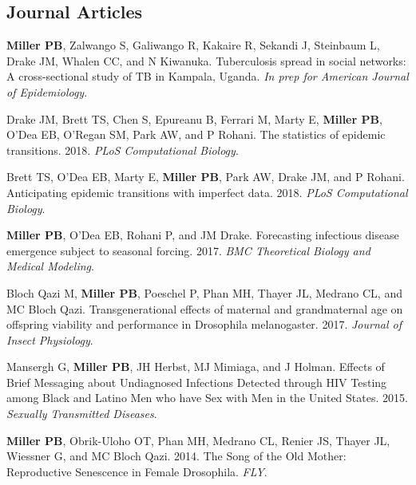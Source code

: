 \documentclass[letterpaper]{article}
\renewenvironment{itemize}{
  \begin{list}{}{
    \setlength{\leftmargin}{1.5em}
  }
}{
  \end{list}
}
\begin{document}
\subsection*{Journal Articles}

\begin{itemize}
\item   \textbf{Miller PB}, Zalwango S, Galiwango R, Kakaire R, Sekandi J, Steinbaum L, Drake JM, Whalen CC, and N Kiwanuka. Tuberculosis spread in social networks: A cross-sectional study of TB in Kampala, Uganda. \textit{In prep for American Journal of Epidemiology}. 
\item Drake JM, Brett TS,  Chen S, Epureanu B, Ferrari M, Marty E, \textbf{Miller PB}, O'Dea EB, O'Regan SM, Park AW, and P Rohani. The statistics of epidemic transitions. 2018. \textit{PLoS Computational Biology}. 
\item Brett TS,  O'Dea EB, Marty E, \textbf{Miller PB}, Park AW, Drake JM, and P Rohani. Anticipating epidemic transitions with imperfect data. 2018. \textit{PLoS Computational Biology}. 
\item \textbf{Miller PB}, O'Dea EB, Rohani P, and JM Drake. Forecasting infectious disease emergence subject to seasonal forcing. 2017. \textit{BMC Theoretical Biology and Medical Modeling}.
\item Bloch Qazi M, \textbf{Miller PB}, Poeschel P, Phan MH, Thayer JL, Medrano CL, and MC Bloch Qazi. Transgenerational effects of maternal and grandmaternal age on offspring viability and performance in Drosophila melanogaster. 2017. \textit{Journal of Insect Physiology}.
\item Mansergh G, \textbf{Miller PB}, JH Herbst, MJ Mimiaga, and J Holman. Effects of Brief Messaging about Undiagnosed Infections Detected through HIV Testing among Black and Latino Men who have Sex with Men in the United States. 2015. \textit{Sexually Transmitted Diseases}.
\item \textbf{Miller PB}, Obrik-Uloho OT, Phan MH, Medrano CL, Renier JS, Thayer JL, Wiessner G, and MC Bloch Qazi. 2014. The Song of the Old Mother: Reproductive Senescence in Female Drosophila. \textit{FLY}.
\end{itemize}
\end{document}
